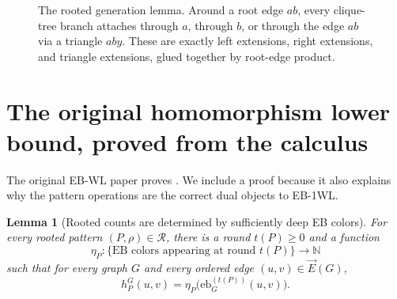 \documentclass[11pt]{article}
\newtheorem{lemma}[theorem]{Lemma}
\newcommand{\N}{\mathbb{N}}
\newcommand{\cR}{\mathcal{R}}
\newcommand{\vecE}{\overrightarrow{E}}
\begin{document}
\begin{figure}[ht]
\centering
{}
\caption{The rooted generation lemma.  Around a root edge $ab$, every clique-tree branch attaches through $a$, through $b$, or through the edge $ab$ via a triangle $aby$.  These are exactly left extensions, right extensions, and triangle extensions, glued together by root-edge product.}
\label{fig:clique-tree-generation}
\end{figure}

\section{The original homomorphism lower bound, proved from the calculus}
\label{sec:original-direction}

The original EB-WL paper proves .  We include a proof because it also explains why the pattern operations are the correct dual objects to EB-1WL.

\begin{lemma}[Rooted counts are determined by sufficiently deep EB colors]
\label{lem:counts-determined-by-color}
For every rooted pattern $(P,\rho)\in\cR$, there is a round $t(P)\geq 0$ and a function
\[
\eta_P:\{\text{EB colors appearing at round }t(P)\}\to\N
\]
such that for every graph $G$ and every ordered edge $(u,v)\in\vecE(G)$,
\[
h_P^G(u,v)=\eta_P\bigl(\mathrm{eb}^{(t(P))}_G(u,v)\bigr).
\]
\end{lemma}
\end{document}
